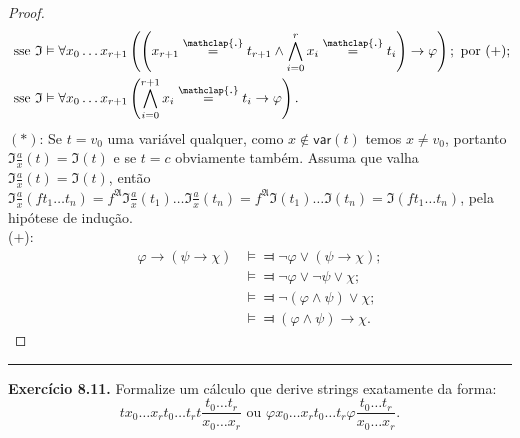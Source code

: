\documentclass[11pt]{article}
\newcommand{\mf}[1]{\mathfrak{#1}}
\newcommand{\msf}[1]{\mathsf{#1}}
\newcommand\overtext[2]{\stackrel{\mathclap{\normalfont\mbox{#1}}}{#2}}
\begin{document}
\begin{proof}
\begin{align*}
        & \text{ sse }\mf{I}\vDash\forall x_0\dots x_{r+1}\left(\left(x_{r+1}\overtext{.}{=}t_{r+1}\wedge\bigwedge_{i=0}^rx_i\overtext{.}{=}t_i\right)\rightarrow\varphi\right);\text{ por (+)};\\
        & \text{ sse }\mf{I}\vDash\forall x_0\dots x_{r+1}\left(\bigwedge_{i=0}^{r+1}x_i\overtext{.}{=}t_i\rightarrow\varphi\right).
    \end{align*}
    $(*)$: Se $t=v_0$ uma variável qualquer, como $x\notin\msf{var}(t)$ temos $x\ne v_0$, portanto $\mf{I}\frac{a}{x}(t)=\mf{I}(t)$ e se $t=c$ obviamente também. Assuma que valha $\mf{I}\frac{a}{x}(t)=\mf{I}(t)$, então $\mf{I}\frac{a}{x}(ft_1\dots t_n)=f^\mf{A}\mf{I}\frac{a}{x}(t_1)\dots\mf{I}\frac{a}{x}(t_n)=f^\mf{A}\mf{I}(t_1)\dots\mf{I}(t_n)=\mf{I}(ft_1\dots t_n)$, pela hipótese de indução.\\
    (+):
    \begin{align*}
        \varphi\rightarrow(\psi\rightarrow\chi) & \vDash\Dashv \neg\varphi\vee(\psi\rightarrow\chi);\\
        & \vDash\Dashv \neg\varphi\vee\neg\psi\vee\chi;\\
        & \vDash\Dashv \neg(\varphi\wedge\psi)\vee\chi;\\
        & \vDash\Dashv (\varphi\wedge\psi)\rightarrow\chi.
    \end{align*}
\end{proof}

\hrule

\begin{shaded}
\textbf{Exercício 8.11.} Formalize um cálculo que derive strings exatamente da forma: $$tx_0\dots x_rt_0\dots t_rt\frac{t_0\dots t_r}{x_0\dots x_r}\text{ ou }\varphi x_0\dots x_rt_0\dots t_r\varphi\frac{t_0\dots t_r}{x_0\dots x_r}.$$
\end{shaded}
\end{document}
